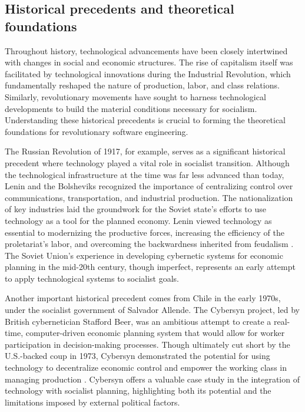 \begin{refsection}
\subsection{Historical precedents and theoretical foundations}

Throughout history, technological advancements have been closely intertwined with changes in social and economic structures. The rise of capitalism itself was facilitated by technological innovations during the Industrial Revolution, which fundamentally reshaped the nature of production, labor, and class relations. Similarly, revolutionary movements have sought to harness technological developments to build the material conditions necessary for socialism. Understanding these historical precedents is crucial to forming the theoretical foundations for revolutionary software engineering.

The Russian Revolution of 1917, for example, serves as a significant historical precedent where technology played a vital role in socialist transition. Although the technological infrastructure at the time was far less advanced than today, Lenin and the Bolsheviks recognized the importance of centralizing control over communications, transportation, and industrial production. The nationalization of key industries laid the groundwork for the Soviet state's efforts to use technology as a tool for the planned economy. Lenin viewed technology as essential to modernizing the productive forces, increasing the efficiency of the proletariat’s labor, and overcoming the backwardness inherited from feudalism \cite[pp.~112]{lenin1947state}. The Soviet Union’s experience in developing cybernetic systems for economic planning in the mid-20th century, though imperfect, represents an early attempt to apply technological systems to socialist goals.

Another important historical precedent comes from Chile in the early 1970s, under the socialist government of Salvador Allende. The Cybersyn project, led by British cybernetician Stafford Beer, was an ambitious attempt to create a real-time, computer-driven economic planning system that would allow for worker participation in decision-making processes. Though ultimately cut short by the U.S.-backed coup in 1973, Cybersyn demonstrated the potential for using technology to decentralize economic control and empower the working class in managing production \cite[pp.~55-60]{medina2011cybersyn}. Cybersyn offers a valuable case study in the integration of technology with socialist planning, highlighting both its potential and the limitations imposed by external political factors.


\end{refsection}
